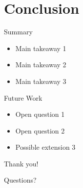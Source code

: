 \documentclass[xcolor=dvipsnames,aspectratio=169]{beamer}
\begin{document}
\section{Conclusion}

\begin{frame}{Summary}
    \begin{itemize}
        \item Main takeaway 1
        \item Main takeaway 2
        \item Main takeaway 3
    \end{itemize}
\end{frame}

\begin{frame}{Future Work}
    \begin{itemize}
        \item Open question 1
        \item Open question 2
        \item Possible extension 3
    \end{itemize}
\end{frame}

\begin{frame}
    \centering
    {\Huge Thank you!}

    \vspace{1em}
    Questions?
\end{frame}
\end{document}
